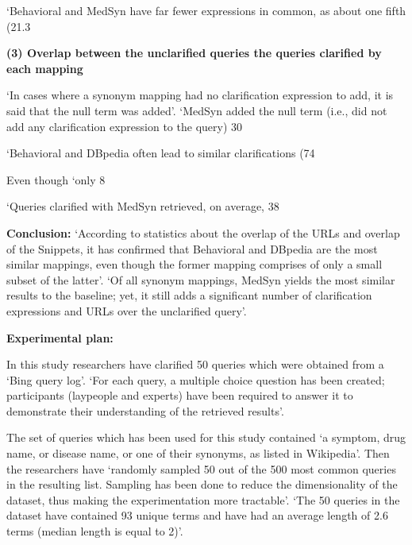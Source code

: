 \documentclass[]{article}
\begin{document}
‘Behavioral and MedSyn have far fewer expressions in common, as about one fifth (21.3 %

\textbf{(3)	Overlap between the unclarified queries the queries clarified by each mapping}


‘In cases where a synonym mapping had no clarification expression to add, it is said that the null term was added’. ‘MedSyn added the null term (i.e., did not add any clarification expression to the query) 30 %
 
‘Behavioral and DBpedia often lead to similar clarifications (74 %

Even though ‘only 8%

‘Queries clarified with MedSyn retrieved, on average, 38 %

\textbf{Conclusion:} ‘According to statistics about the overlap of the URLs and overlap of the Snippets, it has confirmed that Behavioral and DBpedia are the most similar mappings, even though the former mapping comprises of only a small subset of the latter’. ‘Of all synonym mappings, MedSyn yields the most similar results to the baseline; yet, it still adds a significant number of clarification expressions and URLs over the unclarified query’.

\textbf{Experimental plan:}

In this study researchers have clarified 50 queries which were obtained from a ‘Bing query log’. ‘For each query, a multiple choice question has been created; participants (laypeople and experts) have been required to answer it to demonstrate their understanding of the retrieved results’.

The set of queries which has been used for this study contained ‘a symptom, drug name, or disease name, or one of their synonyms, as listed in Wikipedia’. Then the researchers have ‘randomly sampled 50 out of the 500 most common queries in the resulting list. Sampling has been done to reduce the dimensionality of the dataset, thus making the experimentation more tractable’. ‘The 50 queries in the dataset have contained 93 unique terms and have had an average length of 2.6 terms (median length is equal to 2)’. 
\end{document}
